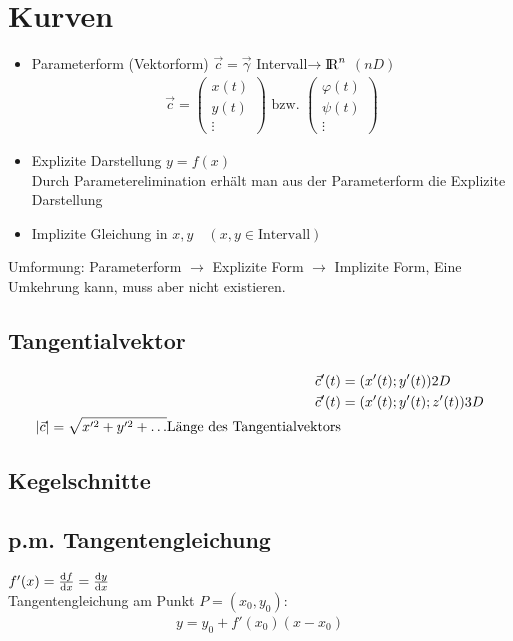 \section{Kurven}
\begin{itemize}
\item Parameterform (Vektorform) $\vec{c}=\vec{\gamma}$ Intervall$\rightarrow\text{\rmfamily I\!R}^n$ $(nD)$
\begin{align*}
	\vec{c}=\begin{pmatrix}x(t) \\y(t)\\\vdots\end{pmatrix} \text{ bzw. } \begin{pmatrix}\varphi(t) \\\psi(t)\\\vdots\end{pmatrix}
\end{align*}
\item Explizite Darstellung $y=f(x)$ \\
	Durch Parameterelimination erhält man aus der Parameterform die Explizite Darstellung
\item Implizite Gleichung in $x,y\quad (x,y\in \text{Intervall})$
\end{itemize}
Umformung: Parameterform $\rightarrow$ Explizite Form $\rightarrow$ Implizite Form, Eine Umkehrung kann, muss aber nicht existieren. 

\subsection{Tangentialvektor}
\begin{align*}
\vec{c}'(t)&=(x'(t);y'(t)) 2D\\
\vec{c}'(t)&=(x'(t);y'(t);z'(t)) 3D\\
\lvert \vec{c}\rvert= \sqrt{x'^2+ y'^2+\dots} \text{Länge des Tangentialvektors} 
\end{align*}

\subsection{Kegelschnitte}

\subsection{p.m. Tangentengleichung}
$f'(x) =\frac{\mathrm{d}f}{\mathrm{d}x}=\frac{\mathrm{d}y}{\mathrm{d}x}$\\
Tangentengleichung am Punkt $P=(x_0,y_0)$:
\begin{align*}
	y=y_0+f'(x_0)(x-x_0)
\end{align*}

